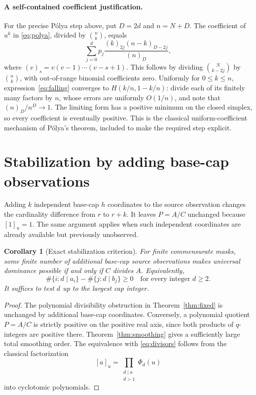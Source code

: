 \documentclass[11pt,a4paper]{article}
\newtheorem{corollary}[theorem]{Corollary}\newtheorem{proposition}[theorem]{Proposition}
\theoremstyle{remark}\newtheorem*{ednote}{Editorial note (ProveIt, 2026-10-01)}
\begin{document}
\paragraph{A self-contained coefficient justification.}
For the precise P\'olya step above, put $D=2d$ and $n=N+D$. The coefficient of $u^k$ in \eqref{eq:polya}, divided by $\binom nk$, equals
\begin{equation}\label{eq:falling}
 \sum_{j=0}^dp_j\frac{(k)_{2j}(n-k)_{D-2j}}{(n)_D},
\end{equation}
where $(v)_s=v(v-1)\cdots(v-s+1)$. This follows by dividing $\binom N{k-2j}$ by $\binom nk$, with out-of-range binomial coefficients zero. Uniformly for $0\le k\le n$, expression~\eqref{eq:falling} converges to $H(k/n,1-k/n)$: divide each of its finitely many factors by $n$, whose errors are uniformly $O(1/n)$, and note that $(n)_D/n^D\to1$. The limiting form has a positive minimum on the closed simplex, so every coefficient is eventually positive. This is the classical uniform-coefficient mechanism of P\'olya's theorem, included to make the required step explicit.

\section{Stabilization by adding base-cap observations}
Adding $k$ independent base-cap $h$ coordinates to the source observation changes the cardinality difference from $r$ to $r+k$. It leaves $P=A/C$ unchanged because $[1]_u=1$. The same argument applies when such independent coordinates are already available but previously unobserved.

\begin{corollary}[Exact stabilization criterion]\label{cor:stabilization}
For finite commensurate masks, some finite number of additional base-cap source observations makes universal dominance possible if and only if $C$ divides $A$. Equivalently,
\begin{equation}\label{eq:divisors}
 \#\{i:d\mid a_i\}-\#\{j:d\mid b_j\}\ge0
 \quad\text{for every integer }d\ge2.
\end{equation}
It suffices to test $d$ up to the largest cap integer.
\end{corollary}
\begin{proof}
The polynomial divisibility obstruction in Theorem~\ref{thm:fixed} is unchanged by additional base-cap coordinates. Conversely, a polynomial quotient $P=A/C$ is strictly positive on the positive real axis, since both products of $q$-integers are positive there. Theorem~\ref{thm:smoothing} gives a sufficiently large total smoothing order. The equivalence with \eqref{eq:divisors} follows from the classical factorization
\[
 [a]_u=\prod_{\substack{d\mid a\\d>1}}\Phi_d(u)
\]
into cyclotomic polynomials.
\end{proof}
\end{document}
